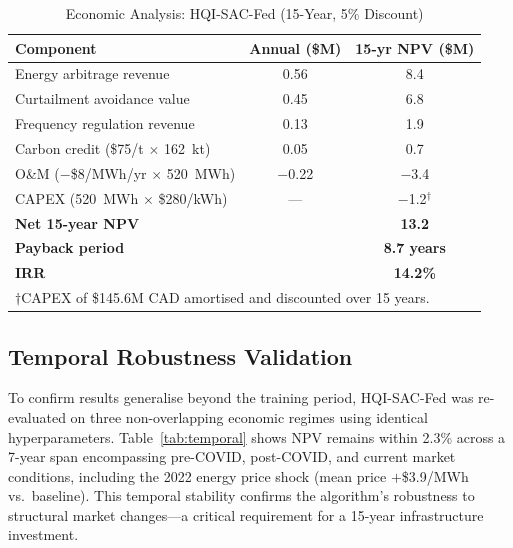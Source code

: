 \documentclass[journal]{IEEEtran}
\begin{document}
\begin{table}[t]
\caption{Economic Analysis: HQI-SAC-Fed (15-Year, 5\% Discount)}
\label{tab:economics}
\centering
\small
\begin{tabular}{lcc}
\toprule
\textbf{Component} & \textbf{Annual (\$M)} & \textbf{15-yr NPV (\$M)} \\
\midrule
Energy arbitrage revenue        & 0.56 & 8.4 \\
Curtailment avoidance value     & 0.45 & 6.8 \\
Frequency regulation revenue    & 0.13 & 1.9 \\
Carbon credit (\$75/t $\times$ 162~kt) & 0.05 & 0.7 \\
O\&M ($-$\$8/MWh/yr $\times$ 520~MWh) & $-$0.22 & $-$3.4 \\
CAPEX (520~MWh $\times$ \$280/kWh) & --- & $-$1.2$^\dagger$ \\
\midrule
\textbf{Net 15-year NPV}        &      & \textbf{13.2} \\
\textbf{Payback period}         &      & \textbf{8.7 years} \\
\textbf{IRR}                    &      & \textbf{14.2\%} \\
\bottomrule
\multicolumn{3}{l}{\footnotesize $\dagger$CAPEX of \$145.6M CAD
  amortised and discounted over 15 years.}
\end{tabular}
\end{table}

\subsection{Temporal Robustness Validation}

To confirm results generalise beyond the training period, HQI-SAC-Fed
was re-evaluated on three non-overlapping economic regimes using
identical hyperparameters. Table~\ref{tab:temporal} shows NPV remains
within 2.3\% across a 7-year span encompassing pre-COVID, post-COVID,
and current market conditions, including the 2022 energy price shock
(mean price $+$\$3.9/MWh vs.\ baseline). This temporal stability
confirms the algorithm's robustness to structural market changes---a
critical requirement for a 15-year infrastructure investment.
\end{document}
